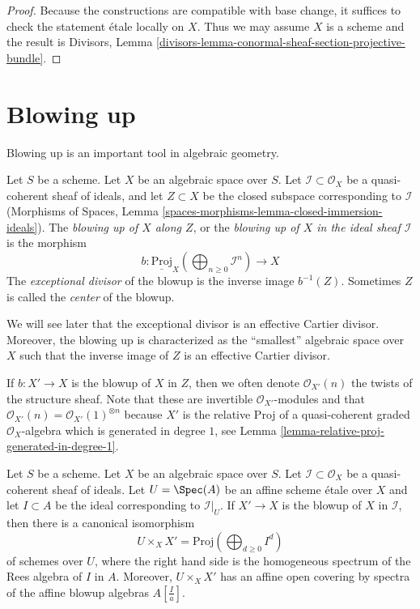 \begin{proof}
Because the constructions are compatible with base change, it suffices to
check the statement \'etale locally on $X$. Thus we may assume $X$ is
a scheme and the result is
Divisors, Lemma \ref{divisors-lemma-conormal-sheaf-section-projective-bundle}.
\end{proof}






\section{Blowing up}
\label{section-blowing-up}

\noindent
Blowing up is an important tool in algebraic geometry.

\begin{definition}
\label{definition-blow-up}
Let $S$ be a scheme. Let $X$ be an algebraic space over $S$.
Let $\mathcal{I} \subset \mathcal{O}_X$ be a quasi-coherent sheaf
of ideals, and let $Z \subset X$ be the closed subspace corresponding
to $\mathcal{I}$
(Morphisms of Spaces, Lemma
\ref{spaces-morphisms-lemma-closed-immersion-ideals}).
The {\it blowing up of $X$ along $Z$}, or the
{\it blowing up of $X$ in the ideal sheaf $\mathcal{I}$} is
the morphism
$$
b :
\underline{\text{Proj}}_X
\left(\bigoplus\nolimits_{n \geq 0} \mathcal{I}^n\right)
\longrightarrow
X
$$
The {\it exceptional divisor} of the blowup is the inverse image
$b^{-1}(Z)$. Sometimes $Z$ is called the {\it center} of the blowup.
\end{definition}

\noindent
We will see later that the exceptional divisor is an effective Cartier
divisor. Moreover, the blowing up is characterized as the ``smallest''
algebraic space over $X$ such that the inverse image of $Z$ is an
effective Cartier divisor.

\medskip\noindent
If $b : X' \to X$ is the blowup of $X$ in $Z$, then we often denote
$\mathcal{O}_{X'}(n)$ the twists of the structure sheaf. Note that these
are invertible $\mathcal{O}_{X'}$-modules and that
$\mathcal{O}_{X'}(n) = \mathcal{O}_{X'}(1)^{\otimes n}$
because $X'$ is the relative Proj of a quasi-coherent graded
$\mathcal{O}_X$-algebra which is generated in degree $1$, see
Lemma \ref{lemma-relative-proj-generated-in-degree-1}.

\begin{lemma}
\label{lemma-blowing-up-affine}
Let $S$ be a scheme. Let $X$ be an algebraic space over $S$.
Let $\mathcal{I} \subset \mathcal{O}_X$ be a
quasi-coherent sheaf of ideals. Let $U = \Spec(A)$ be an affine scheme
\'etale over $X$ and let $I \subset A$ be the ideal corresponding to
$\mathcal{I}|_U$. If $X' \to X$ is the blowup of $X$ in $\mathcal{I}$,
then there is a canonical isomorphism
$$
U \times_X X' = \text{Proj}(\bigoplus\nolimits_{d \geq 0} I^d)
$$
of schemes over $U$, where the right hand side is
the homogeneous spectrum of the Rees algebra of $I$ in $A$.
Moreover, $U \times_X X'$ has an affine open covering by
spectra of the affine blowup algebras $A[\frac{I}{a}]$.
\end{lemma}

